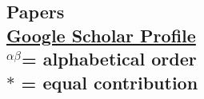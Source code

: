 \documentclass[margin]{res}
\newcommand{\field}[2]{\noindent \textbf{#1} \hfill #2 \\}
\newcommand{\alphabeticalorder}[0]{\ensuremath {^{\alpha \beta}}}
\newcommand{\specialurl}[2]{\href {#2} {{{[#1]}}}}
\newcommand{\preprint}[1]{\specialurl {preprint} {#1}}
\newcommand{\code}[1]{\specialurl {code} {#1}}
\newcommand{\talk}[1]{\specialurl {talk} {#1}}
\newcommand{\slides}[1]{\specialurl {slides} {#1}}
\newcommand{\paper}[1]{\specialurl {paper} {#1}}
\newcommand{\authorref}[1]{{\textit{\textbf{#1}}}}
\newcommand{\news}[1]{\specialurl {news} {#1}}
\newcommand{\authorme}{\authorref{Marios Papachristou}}
\newcommand{\publication}[5]{\textbf{#1}\\{#2}\\\emph{#3}, {#4}\\{#5}\smallskip}
\begin{document}
\begin{resume}
\section{Papers \\ {
\footnotesize
\textup{\href{https://scholar.google.gr/citations?user=T12JO3MAAAAJ&hl=en}{Google Scholar Profile}} \\\alphabeticalorder  = \textup{alphabetical order} \\ $*$ = \textup{equal contribution}
}}
%
%
%
%	
%
%   	   
%	


\end{resume}
\end{document}
